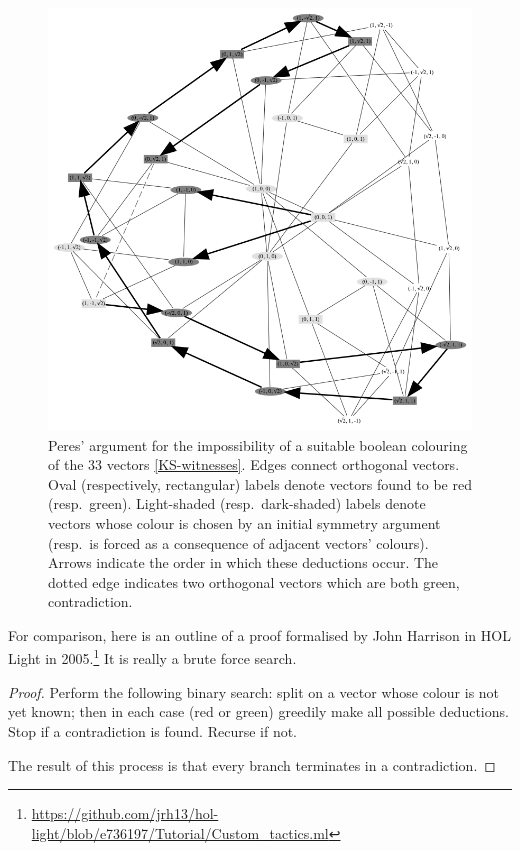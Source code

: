 \documentclass[12pt]{llncs}
\begin{document}
\begin{figure}
  \centering
\includegraphics*[scale=0.25]{ks-chase.png}
\caption{Peres' argument \cite{Per91} for the impossibility of a suitable boolean colouring of the 33 vectors \cref{KS-witnesses}.
Edges connect orthogonal vectors.
Oval (respectively, rectangular) labels denote vectors found to be red (resp.\ green).
Light-shaded (resp.\ dark-shaded) labels denote vectors whose colour is chosen by an initial symmetry argument
(resp.\ is forced as a consequence of adjacent vectors' colours).
Arrows indicate the order in which these deductions occur.
The dotted edge indicates two orthogonal vectors which are both green, contradiction.}
\label{fig:peres-graph}
\end{figure}



For comparison, here is an outline of a proof formalised by John Harrison in HOL Light in 2005.\footnote{
  \url{https://github.com/jrh13/hol-light/blob/e736197/Tutorial/Custom_tactics.ml}}
It is really a brute force search.

\begin{proof}
Perform the following binary search:
split on a vector whose colour is not yet known;
then in each case (red or green) greedily make all possible deductions.
Stop if a contradiction is found. Recurse if not.

The result of this process is that every branch terminates in a contradiction.
\end{proof}
\end{document}
